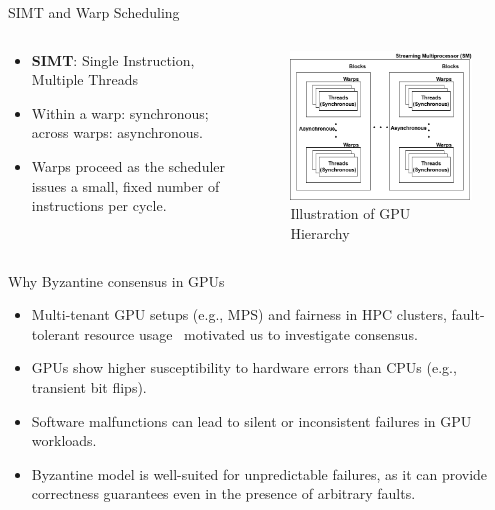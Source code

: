 \documentclass{beamer}
\begin{document}
\begin{frame}{SIMT and Warp Scheduling}
\begin{columns}[T] %
  \begin{column}{0.5\textwidth}
    \begin{itemize}
      \item \textbf{SIMT}: Single Instruction, Multiple Threads 
      \item Within a warp: synchronous; across warps: asynchronous.
      \item Warps proceed as the scheduler issues a small, fixed number of instructions per cycle.
    \end{itemize}
  \end{column}

  \begin{column}{0.5\textwidth}
    \begin{figure}
      \centering
      \includegraphics[width=\linewidth]{gpuHier.png}
      \caption{Illustration of GPU Hierarchy}
      \label{fig:GPU-hier}
    \end{figure}
  \end{column}
\end{columns}
\end{frame}

\begin{frame}{Why Byzantine consensus in GPUs}
\begin{itemize}
  \item Multi-tenant GPU setups (e.g., MPS) and fairness in HPC clusters, fault-tolerant resource usage~ motivated us to investigate consensus.
  \item GPUs show higher susceptibility to hardware errors than CPUs (e.g., transient bit flips).
  \item Software malfunctions can lead to silent or inconsistent failures in GPU workloads.
  \item Byzantine model is well-suited for unpredictable failures, as it can provide correctness guarantees even in the presence of arbitrary faults.
\end{itemize}
\end{frame}
\end{document}

